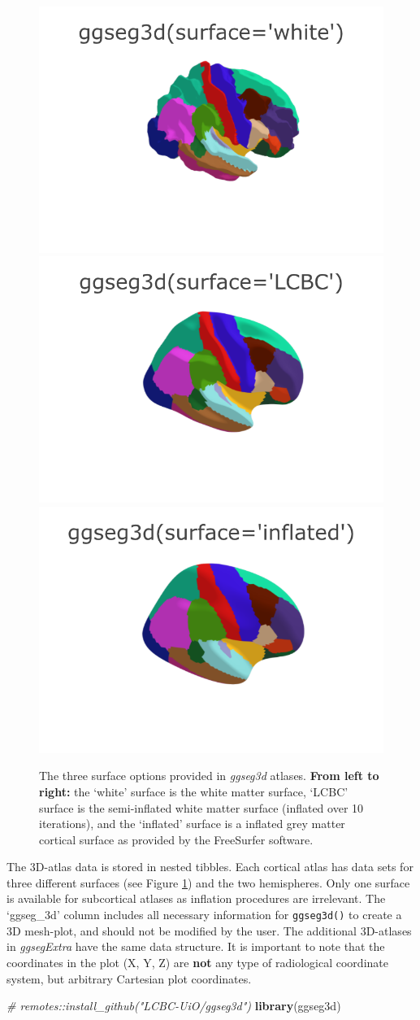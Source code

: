 \documentclass[fleqn,10pt]{wlpeerj} %
\newenvironment{Shaded}{\begin{snugshade}}{\end{snugshade}}
\newcommand{\CommentTok}[1]{\textcolor[rgb]{0.56,0.35,0.01}{\textit{#1}}}
\newcommand{\KeywordTok}[1]{\textcolor[rgb]{0.13,0.29,0.53}{\textbf{#1}}}
\newcommand{\NormalTok}[1]{#1}
\begin{document}
\begin{figure}[H]
\includegraphics[width=0.3\linewidth]{png/ggseg3d_white} \includegraphics[width=0.3\linewidth]{png/ggseg3d} \includegraphics[width=0.3\linewidth]{png/ggseg3d_inflated} \caption{The three surface options provided in \emph{ggseg3d} atlases. \textbf{From left to right:} the `white' surface is the white matter surface, `LCBC' surface is the semi-inflated white matter surface (inflated over 10 iterations), and the `inflated' surface is a inflated grey matter cortical surface as provided by the FreeSurfer software.}\label{fig:ggseg3d-1-out}
\end{figure}

The 3D-atlas data is stored in nested tibbles.
Each cortical atlas has data sets for three different surfaces (see Figure \ref{fig:ggseg3d-1-out}) and the two hemispheres.
Only one surface is available for subcortical atlases as inflation procedures are irrelevant.
The `ggseg\_3d' column includes all necessary information for \texttt{ggseg3d()} to create a 3D mesh-plot, and should not be modified by the user.
The additional 3D-atlases in \emph{ggsegExtra} have the same data structure.
It is important to note that the coordinates in the plot (X, Y, Z) are \textbf{not} any type of radiological coordinate system, but arbitrary Cartesian plot coordinates.

\small

\begin{Shaded}
\begin{Highlighting}[]
\CommentTok{\# remotes::install\_github("LCBC{-}UiO/ggseg3d")}
\KeywordTok{library}\NormalTok{(ggseg3d)}
\end{Highlighting}
\end{Shaded}
\end{document}

